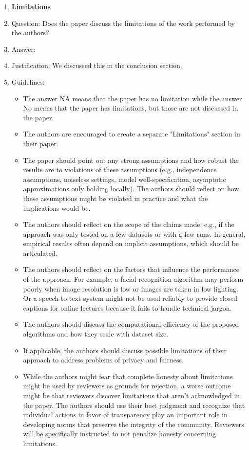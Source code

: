 \documentclass{article}
\theoremstyle{plain}
\begin{document}
\begin{enumerate}
\item {\bf Limitations}
    \item[] Question: Does the paper discuss the limitations of the work performed by the authors?
    \item[] Answer: \answerYes{} %
    \item[] Justification: We discussed this in the conclusion section.
    \item[] Guidelines:
    \begin{itemize}
        \item The answer NA means that the paper has no limitation while the answer No means that the paper has limitations, but those are not discussed in the paper. 
        \item The authors are encouraged to create a separate "Limitations" section in their paper.
        \item The paper should point out any strong assumptions and how robust the results are to violations of these assumptions (e.g., independence assumptions, noiseless settings, model well-specification, asymptotic approximations only holding locally). The authors should reflect on how these assumptions might be violated in practice and what the implications would be.
        \item The authors should reflect on the scope of the claims made, e.g., if the approach was only tested on a few datasets or with a few runs. In general, empirical results often depend on implicit assumptions, which should be articulated.
        \item The authors should reflect on the factors that influence the performance of the approach. For example, a facial recognition algorithm may perform poorly when image resolution is low or images are taken in low lighting. Or a speech-to-text system might not be used reliably to provide closed captions for online lectures because it fails to handle technical jargon.
        \item The authors should discuss the computational efficiency of the proposed algorithms and how they scale with dataset size.
        \item If applicable, the authors should discuss possible limitations of their approach to address problems of privacy and fairness.
        \item While the authors might fear that complete honesty about limitations might be used by reviewers as grounds for rejection, a worse outcome might be that reviewers discover limitations that aren't acknowledged in the paper. The authors should use their best judgment and recognize that individual actions in favor of transparency play an important role in developing norms that preserve the integrity of the community. Reviewers will be specifically instructed to not penalize honesty concerning limitations.
    \end{itemize}


\end{enumerate}
\end{document}
